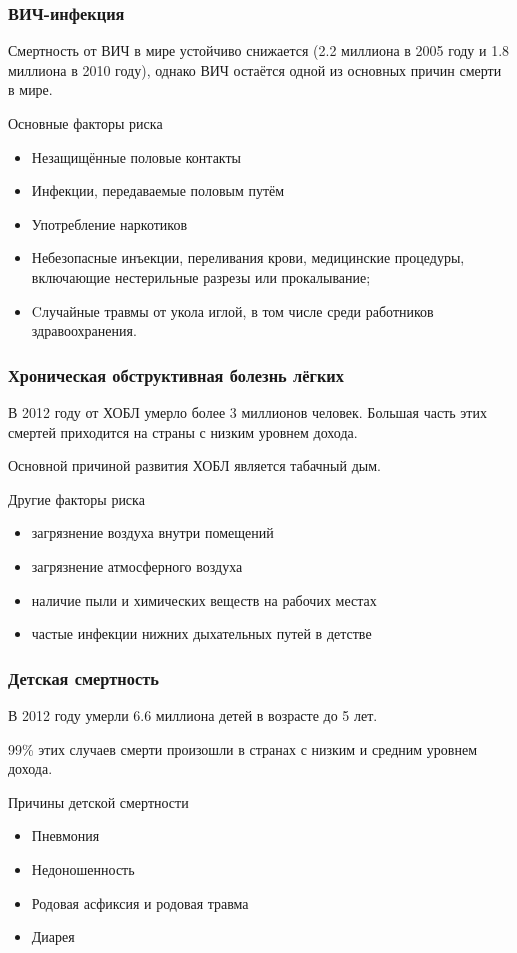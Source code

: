 \documentclass[10pt]{beamer}
\begin{document}
	\begin{frame}
		\frametitle{ВИЧ-инфекция}
		{\small
		Смертность от ВИЧ в мире устойчиво снижается (2.2 миллиона в 2005 году и 1.8 миллиона в 2010 году), 
		однако ВИЧ остаётся одной из основных причин смерти в мире.

		\begin{block}{Основные факторы риска}
			\begin{itemize}				
     \item Незащищённые половые контакты
	\item Инфекции, передаваемые половым путём
	\item Употребление наркотиков
    	\item Небезопасные инъекции, переливания крови, медицинские процедуры, включающие нестерильные разрезы или прокалывание;
    	\item Cлучайные травмы от укола иглой, в том числе среди работников здравоохранения.
			\end{itemize}
		\end{block}
		}
	\end{frame}

	\begin{frame}
		\frametitle{Хроническая обструктивная болезнь лёгких}
		{\small 
		В 2012 году от ХОБЛ умерло более 3 миллионов человек. Большая часть этих смертей приходится на
		страны с низким уровнем дохода.

		\begin{alertblock}{}
		Основной причиной развития ХОБЛ является табачный дым.
		\end{alertblock}
		\begin{block}{Другие факторы риска}
			\begin{itemize}
    \item загрязнение воздуха внутри помещений 
    \item загрязнение атмосферного воздуха
    \item наличие пыли и химических веществ на рабочих местах
    \item частые инфекции нижних дыхательных путей в детстве

			\end{itemize}
		\end{block}
		}
	\end{frame}

	\begin{frame}
		\frametitle{Детская смертность}
		В 2012 году умерли 6.6 миллиона детей в возрасте до 5 лет.

		99\% этих случаев смерти произошли в странах с низким и средним уровнем дохода.

		\begin{block}{Причины детской смертности}
			\begin{itemize}
				\item Пневмония
				\item Недоношенность
				\item Родовая асфиксия и родовая травма
				\item Диарея
			\end{itemize}
		\end{block}
	\end{frame}
	
\end{document}
